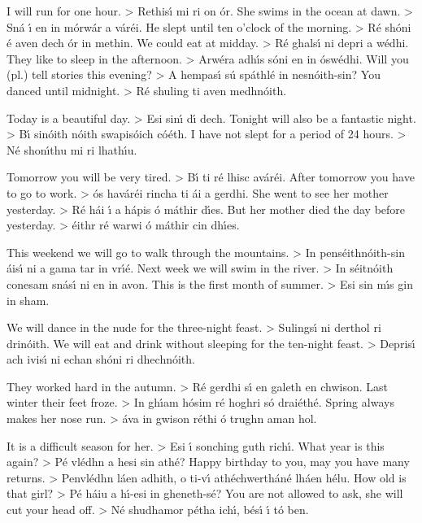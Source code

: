 I will run for one hour. > Rethis\'{\i} mi ri on \'{o}r.
She swims in the ocean at dawn. > Sn\'{a} \'{\i} en in m\'{o}rw\'{a}r a v\'{a}r\'{e}i.
He slept until ten o’clock of the morning. > R\'{e} sh\'{o}ni \'{e} aven dech \'{o}r in methin.
We could eat at midday. > R\'{e} ghals\'{\i} ni depri a w\'{e}dhi.
They like to sleep in the afternoon. > Arw\'{e}ra adh\'{\i}s s\'{o}ni en in \'{o}sw\'{e}dhi.
Will you (pl.) tell stories this evening? > A hempas\'{\i} s\'{u} sp\'{a}thl\'{e} in nesn\'{o}ith-sin?
You danced until midnight. > R\'{e} shuling ti aven medhn\'{o}ith.

Today is a beautiful day. > Esi sin\'{\i} d\'{\i} dech.
Tonight will also be a fantastic night. > B\'{\i} sin\'{o}ith n\'{o}ith swapis\'{o}ich c\'{o}\'{e}th.
I have not slept for a period of 24 hours. > N\'{e} shon\'{\i}thu mi ri lhath\'{\i}u.

Tomorrow you will be very tired. > B\'{\i} ti r\'{e} lhisc av\'{a}r\'{e}i.
After tomorrow you have to go to work. > \'{o}s hav\'{a}r\'{e}i rincha ti \'{a}i a gerdhi.
She went to see her mother yesterday. > R\'{e} h\'{a}i \'{\i} a h\'{a}pis \'{o} m\'{a}thir d\'{\i}es.
But her mother died the day before yesterday. > \'{e}ithr r\'{e} warwi \'{o} m\'{a}thir cin dh\'{\i}es.

This weekend we will go to walk through the mountains. > In pens\'{e}ithn\'{o}ith-sin \'{a}is\'{\i} ni a gama 
                                                                                               tar in vr\'{\i}\'{e}.
Next week we will swim in the river. > In s\'{e}itn\'{o}ith conesam sn\'{a}s\'{\i} ni en in avon.
This is the first month of summer. > Esi sin m\'{\i}s gin in sham.

We will dance in the nude for the three-night feast. > Sulings\'{\i} ni derthol ri drin\'{o}ith.
We will eat and drink without sleeping for the ten-night feast. > Depris\'{\i} ach ivis\'{\i} ni echan 
                                                                                                       sh\'{o}ni ri dhechn\'{o}ith.

They worked hard in the autumn. > R\'{e} gerdhi s\'{\i} en galeth en chwison.
Last winter their feet froze. > In gh\'{\i}am h\'{o}sim r\'{e} hoghri s\'{o} drai\'{e}th\'{e}.
Spring always makes her nose run. > \'{a}va in gwison r\'{e}thi \'{o} trughn aman hol.

It is a difficult season for her. > Esi \'{\i} sonching guth rich\'{\i}.
What year is this again? > P\'{e} vl\'{e}dhn a hesi sin ath\'{e}?
Happy birthday to you, may you have many returns. > Penvl\'{e}dhn l\'{a}en adhith, o ti-v\'{\i}  
                                                                                        ath\'{e}chwerth\'{a}n\'{e} lh\'{a}en h\'{e}lu.
How old is that girl? > P\'{e} h\'{a}iu a h\'{\i}-esi in gheneth-s\'{e}?
You are not allowed to ask, she will cut your head off. > N\'{e} shudhamor p\'{e}tha ich\'{\i}, b\'{e}s\'{\i} \'{\i} t\'{o} 
                                                                                           ben.

